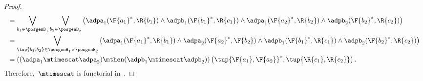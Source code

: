 \begin{proof}
\begin{equation}
\begin{aligned}
            &=\bigvee_{b_1\in \posgenB_1}\bigvee_{b_2\in \posgenB_2} \left(\adpa_1(\F{a_1}^*,\R{b_1})\wedge \adpb_1(\F{b_1}^*,\R{c_1})\wedge \adpa_1(\F{a_2}^*,\R{b_2})\wedge \adpb_2(\F{b_2}^*,\R{c_2}) \right)\\
            &=\bigvee_{\tup{b_1,b_2}\in \posgenB_1\times \posgenB_2} \left(\adpa_1(\F{a_1}^*,\R{b_1})\wedge \adpa_2(\F{a_2}^*,\F{b_2})\wedge \adpb_1(\F{b_1}^*,\R{c_1})\wedge \adpb_2(\F{b_2}^*,\R{c_2}) \right)\\
            &=\left( (\adpa_1\mtimescat \adpa_2)\mthen (\adpb_1\mtimescat \adpb_2)\right)\left(\tup{\F{a_1},\F{a_2}}^*,\tup{\R{c_1},\R{c_2}} \right).
        \end{aligned}
    \end{equation}
    Therefore,~$\mtimescat$ is functorial in~\DP.
\end{proof}



